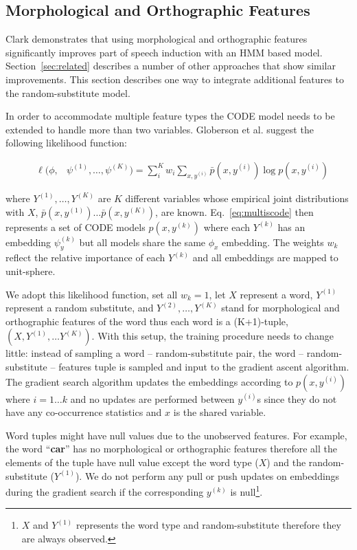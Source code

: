 \subsection{Morphological and Orthographic Features}
\label{sec:feat}

Clark  demonstrates that
using morphological and orthographic features significantly improves
part of speech induction with an HMM based model.
Section~\ref{sec:related} describes a number of other approaches that
show similar improvements.  This section describes one way to
integrate additional features to the random-substitute model.

In order to accommodate multiple feature types the CODE model needs to
be extended to handle more than two variables.  Globerson et
al.  suggest the following
likelihood function:

\begin{eqnarray}
&\ell(\phi,& \psi^{(1)}, \ldots, \psi^{(K)}) = \label{eq:multiscode} \sum_i^K w_i \sum_{x,y^{(i)}} \bar{p}(x,y^{(i)}) \log p(x,y^{(i)})
\end{eqnarray}

\noindent where $Y^{(1)}, \ldots, Y^{(K)}$ are $K$ different variables
whose empirical joint distributions with $X$,
$\bar{p}(x,y^{(1)})\ldots\bar{p}(x,y^{(K)})$, are known.
Eq.~\ref{eq:multiscode} then represents a set of CODE models
$p(x,y^{(k)})$ where each $Y^{(k)}$ has an embedding $\psi_y^{(k)}$
but all models share the same $\phi_x$ embedding.  The weights $w_k$
reflect the relative importance of each $Y^{(k)}$ and all embeddings
are mapped to unit-sphere.

We adopt this likelihood function, set all $w_k=1$, let $X$ represent
a word, $Y^{(1)}$ represent a random substitute, and $Y^{(2)}, \ldots,
Y^{(K)}$ stand for morphological and orthographic features of the word
thus each word is a (K+1)-tuple, $(X, Y^{(1)}, \hdots Y^{(K)})$.  With
this setup, the training procedure needs to change little: instead of
sampling a word -- random-substitute pair, the word --
random-substitute -- features tuple is sampled and input to the
gradient ascent algorithm.  The gradient search algorithm updates the
embeddings according to $p(x,y^{(i)})$ where $i=1\hdots k$ and no
updates are performed between $y^{(i)}$s since they do not have any
co-occurrence statistics and $x$ is the shared variable.

Word tuples might have null values due to the unobserved features.
For example, the word ``\textbf{car}'' has no morphological or
orthographic features therefore all the elements of the tuple have
null value except the word type ($X$) and the random-substitute
($Y^{(1)}$).  We do not perform any pull or push updates on embeddings
during the gradient search if the corresponding $y^{(k)}$ is
null\footnote{$X$ and $Y^{(1)}$ represents the word type and
  random-substitute therefore they are always observed.}.

